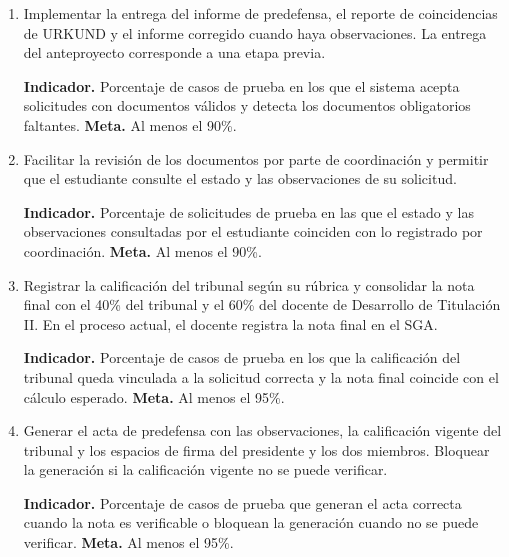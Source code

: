 \begin{enumerate}
    \item Implementar la entrega del informe de predefensa, el reporte de
    coincidencias de URKUND y el informe corregido cuando haya observaciones.
    La entrega del anteproyecto corresponde a una etapa previa.

    \textbf{Indicador.} Porcentaje de casos de prueba en los que el sistema
    acepta solicitudes con documentos válidos y detecta los documentos
    obligatorios faltantes. \textbf{Meta.} Al menos el 90\%.

    \item Facilitar la revisión de los documentos por parte de coordinación y
    permitir que el estudiante consulte el estado y las observaciones de su
    solicitud.

    \textbf{Indicador.} Porcentaje de solicitudes de prueba en las que el
    estado y las observaciones consultadas por el estudiante coinciden con lo
    registrado por coordinación. \textbf{Meta.} Al menos el 90\%.

    \item Registrar la calificación del tribunal según su rúbrica y
    consolidar la nota final con el 40\% del tribunal y el 60\% del docente
    de Desarrollo de Titulación II.
    En el proceso actual, el docente registra la nota final en el SGA.

    \textbf{Indicador.} Porcentaje de casos de prueba en los que la
    calificación del tribunal queda vinculada a la solicitud correcta y
    la nota final coincide con el cálculo esperado. \textbf{Meta.} Al menos el 95\%.

    \item Generar el acta de predefensa con las observaciones, la calificación
    vigente del tribunal y los espacios de firma del presidente y los dos
    miembros. Bloquear la generación si la calificación vigente no se
    puede verificar.

    \textbf{Indicador.} Porcentaje de casos de prueba que generan el acta
    correcta cuando la nota es verificable o bloquean la generación cuando
    no se puede verificar. \textbf{Meta.} Al menos el 95\%.
\end{enumerate}

